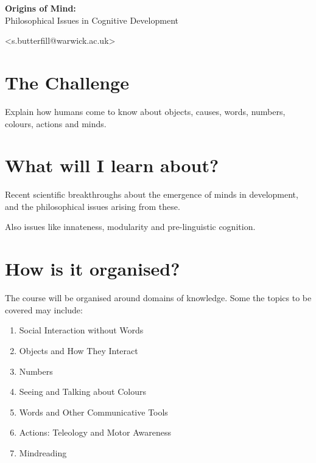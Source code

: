 \documentclass[12pt]{extarticle}
\date{}
\begin{document}
\begin{multicols}{3}

\setlength\footnotesep{1em}







\begin{center}
{\Large
\textbf{Origins of Mind:}
\\ {Philosophical Issues in Cognitive Development}
}


<s.butterfill@warwick.ac.uk>

\end{center}



\section{The Challenge}
Explain how humans come to know about objects, causes, words, numbers, colours, actions and minds.

\section{What will I learn about?}
Recent scientific breakthroughs about the emergence of minds in development, and the philosophical issues arising from these.

Also issues like innateness, modularity and pre-linguistic cognition.

\section{How is it organised?}
The course will be organised around domains of knowledge.
Some the topics to be covered may include:
\begin{enumerate}
\item Social Interaction without Words
\item Objects and How They Interact
\item Numbers
\item Seeing and Talking about Colours
\item Words and Other Communicative Tools
\item Actions: Teleology and Motor Awareness
\item Mindreading
\end{enumerate}



\end{multicols}
\end{document}
